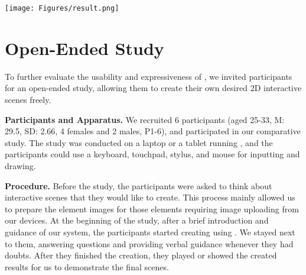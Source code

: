 \begin{figure*}[t]
\texttt{[image: Figures/result.png]}
  \caption{}
  \label{fig:result}
\end{figure*}

\section{Open-Ended Study}
To further evaluate the usability and expressiveness of \sysName, we invited participants for an open-ended study, allowing them to create their own desired 2D interactive scenes freely.

\textbf{Participants and Apparatus.}
We recruited 6 participants (aged 25-33, M: 29.5, SD: 2.66, 4 females and 2 males, P1-6), and  %
participated in our comparative study. 
The study was %
conducted on %
a laptop or a tablet running \sysName, and the participants could %
use a keyboard, touchpad, {stylus}, %
and mouse for inputting and drawing.

\textbf{Procedure.}
Before the study, the participants were %
asked to think about %
interactive scenes that they would like %
to create. This process mainly allowed us to prepare the element images for {those elements requiring image uploading  %
from our devices}. At the beginning of the study, after a %
brief introduction and guidance of our system, the participants %
started creating using \sysName. We stayed next to them, %
answering questions and providing verbal guidance whenever they had doubts. After they finished the creation, they played or showed the created results for us to demonstrate the final scenes.

